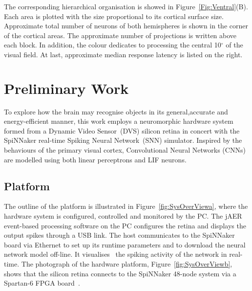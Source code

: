 \documentclass[journal]{journal}
\begin{document}
The corresponding hierarchical organisation is showed in Figure~\ref{Fig:Ventral}(B).
Each area is plotted with the size proportional to its cortical surface size.
Approximate total number of neurons of both hemispheres is shown in the corner of the cortical areas.
The approximate number of projections is written above each block.
In addition, the colour dedicates to processing the central 10$^\circ$ of the visual field.
At last, approximate median response latency is listed on the right.

\section{Preliminary Work}
To explore how the brain may recognise objects in its general,accurate and energy-efficient manner, this work employs a neuromorphic hardware system formed from a Dynamic Video Sensor~(DVS) silicon retina in concert with the SpiNNaker real-time Spiking Neural Network~(SNN) simulator.
Inspired by the behaviours of the primary visual cortex, Convolutional Neural Networks (CNNs) are modelled using both linear perceptrons and LIF neurons.

\subsection{Platform}
The outline of the platform is illustrated in Figure~\ref{fig:SysOverViewa}, where the hardware system is configured, controlled and monitored by the PC.
The jAER~\cite{delbruck2008frame} event-based processing software on the PC configures the retina and displays the output spikes through a USB link.
The host communicates to the SpiNNaker board via Ethernet to set up its runtime parameters and to download the neural network model off-line.
It visualises~\cite{6252490} the spiking activity of the network in real-time.
The photograph of the hardware platform, Figure~\ref{fig:SysOverViewb}, shows that the silicon retina connects to the SpiNNaker 48-node system via a Spartan-6 FPGA board~\cite{galluppi2012real}.
\end{document}
